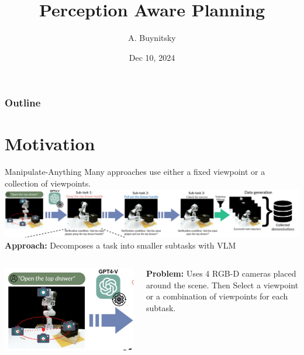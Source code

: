 \documentclass{beamer}
\title[Perception Aware Planning]{Perception Aware Planning}
\author[CS 592-RM]{A. Buynitsky}
\date{Dec 10, 2024}
\begin{document}
\frame{\titlepage}


\begin{frame}
\frametitle{Outline}
\tableofcontents
\end{frame}
\section{Motivation}
\begin{frame}[t]{Manipulate-Anything}
    \vspace{-1em}
    Many approaches use either a fixed viewpoint or a collection of viewpoints.
    \includegraphics[width=\textwidth]{./img/motivation_0.png}
    \textbf{Approach:} Decomposes a task into smaller subtasks with VLM
    \pause
    \begin{columns}
		\begin{column}{.5\textwidth}
            \begin{center}
                \vspace{-1em}
                \includegraphics[width=\textwidth]{./img/motivation_1.png}
            \end{center}
		\end{column}
		\hspace{1em}
		\begin{column}{.5\textwidth}
            \textbf{Problem:} Uses 4 RGB-D cameras placed around the scene. Then Select a viewpoint or a combination of viewpoints for each subtask.
		\end{column}
	\end{columns}
\end{frame}
\end{document}

